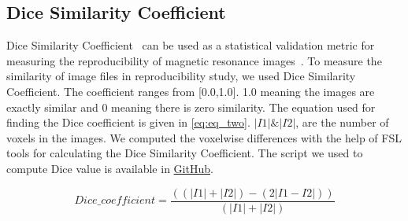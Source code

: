 \DontPrintSemicolon
{}
\hfill \break
\hfill \break
{}
\fi

\subsection{Dice Similarity Coefficient}

Dice Similarity Coefficient~\cite{ECY:ECY1945263297} can be used as a 
statistical validation metric for measuring the reproducibility of 
magnetic resonance images~\cite{Zou2004}. To measure the similarity of 
image files in reproducibility study, we used Dice Similarity 
Coefficient. The coefficient ranges from [0.0,1.0]. 1.0 meaning the 
images are exactly similar and 0 meaning there is zero similarity. The 
equation used for finding the Dice coefficient is given in 
\ref{eq:eq_two}. $|I1|\&|I2|$, are the number of voxels in the images. We computed the voxelwise 
differences with the help of FSL tools for calculating the Dice 
Similarity Coefficient. The script we used to compute Dice value is 
available in 
\href{https://github.com/big-data-lab-team/repro-tools/blob/master/metrics/dice.sh}{GitHub}.


\begin{equation}
  \label{eq:eq_two}
    Dice\_coefficient = \frac{((|I1| + |I2|) - (2|I1 - I2|))}{(|I1| + |I2|)}
\end{equation}

